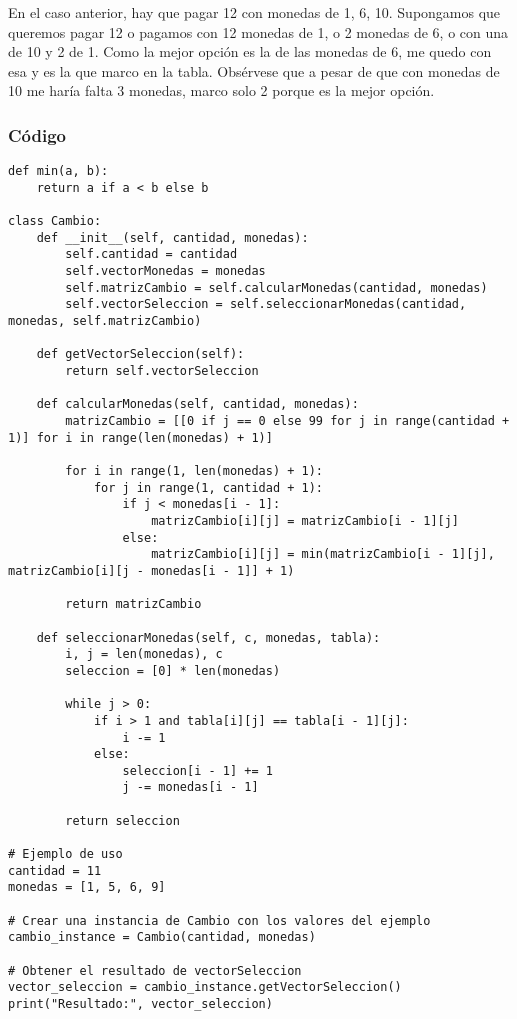 En el caso anterior, hay que pagar 12 con monedas de 1, 6, 10. Supongamos que queremos pagar 12 o pagamos con 12 monedas de 1, o 2 monedas de 6, o con una de 10 y 2 de 1. Como la mejor opción es la de las monedas de 6, me quedo con esa y es la que marco en la tabla. Obsérvese que a pesar de que con monedas de 10 me haría falta 3 monedas, marco solo 2 porque es la mejor opción.

\subsubsection{Código}
\begin{lstlisting}
def min(a, b):
    return a if a < b else b

class Cambio:
    def __init__(self, cantidad, monedas):
        self.cantidad = cantidad
        self.vectorMonedas = monedas
        self.matrizCambio = self.calcularMonedas(cantidad, monedas)
        self.vectorSeleccion = self.seleccionarMonedas(cantidad, monedas, self.matrizCambio)
    
    def getVectorSeleccion(self):
        return self.vectorSeleccion
    
    def calcularMonedas(self, cantidad, monedas):
        matrizCambio = [[0 if j == 0 else 99 for j in range(cantidad + 1)] for i in range(len(monedas) + 1)]
        
        for i in range(1, len(monedas) + 1):
            for j in range(1, cantidad + 1):
                if j < monedas[i - 1]:
                    matrizCambio[i][j] = matrizCambio[i - 1][j]
                else:
                    matrizCambio[i][j] = min(matrizCambio[i - 1][j], matrizCambio[i][j - monedas[i - 1]] + 1)
        
        return matrizCambio
    
    def seleccionarMonedas(self, c, monedas, tabla):
        i, j = len(monedas), c
        seleccion = [0] * len(monedas)
        
        while j > 0:
            if i > 1 and tabla[i][j] == tabla[i - 1][j]:
                i -= 1
            else:
                seleccion[i - 1] += 1
                j -= monedas[i - 1]
        
        return seleccion

# Ejemplo de uso
cantidad = 11
monedas = [1, 5, 6, 9]

# Crear una instancia de Cambio con los valores del ejemplo
cambio_instance = Cambio(cantidad, monedas)

# Obtener el resultado de vectorSeleccion
vector_seleccion = cambio_instance.getVectorSeleccion()
print("Resultado:", vector_seleccion)
\end{lstlisting}

